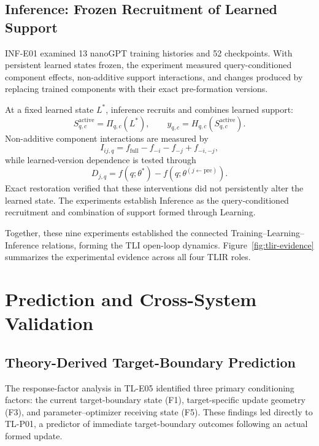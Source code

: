 \documentclass[12pt,letterpaper]{article}
\begin{document}
\subsection{Inference: Frozen Recruitment of Learned Support}
INF-E01 examined 13 nanoGPT training histories and 52 checkpoints. With persistent learned states frozen, the experiment measured query-conditioned component effects, non-additive support interactions, and changes produced by replacing trained components with their exact pre-formation versions.

At a fixed learned state $L^*$, inference recruits and combines learned support:
\begin{equation}
 S_{q,c}^{\mathrm{active}}=\Pi_{q,c}(L^*),\qquad
 y_{q,c}=H_{q,c}(S_{q,c}^{\mathrm{active}}).
 \label{eq:inference}
\end{equation}
Non-additive component interactions are measured by
\begin{equation}
 I_{ij,q}=f_{\mathrm{full}}-f_{-i}-f_{-j}+f_{-i,-j},
 \label{eq:interaction}
\end{equation}
while learned-version dependence is tested through
\begin{equation}
 D_{j,q}=f(q;\theta^*)-f(q;\theta^{(j\leftarrow\mathrm{pre})}).
 \label{eq:rollback}
\end{equation}
Exact restoration verified that these interventions did not persistently alter the learned state. The experiments establish Inference as the query-conditioned recruitment and combination of support formed through Learning.

Together, these nine experiments established the connected Training--Learning--Inference relations, forming the TLI open-loop dynamics. Figure~\ref{fig:tlir-evidence} summarizes the experimental evidence across all four TLIR roles.




\section{Prediction and Cross-System Validation}
\subsection{Theory-Derived Target-Boundary Prediction}
The response-factor analysis in TL-E05 identified three primary conditioning factors: the current target-boundary state (F1), target-specific update geometry (F3), and parameter--optimizer receiving state (F5). These findings led directly to TL-P01, a predictor of immediate target-boundary outcomes following an actual formed update.
\end{document}
